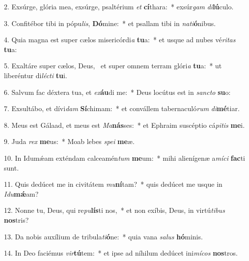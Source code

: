 2. Exsúrge, glória mea, exsúrge, psaltérium \textit{et} \textbf{cí}thara:~*  exsúr\textit{gam} \textit{di}\textbf{lú}culo.\

3. Confitébor tibi in pópu\textit{lis}, \textbf{Dó}mine:~*  et psallam tibi in \textit{na}\textit{ti}\textbf{ó}nibus.\

4. Quia magna est super cælos misericórdi\textit{a} \textbf{tu}a:~*  et usque ad nubes vé\textit{ri}\textit{tas} \textbf{tu}a:\

5. Exaltáre super cælos, Deus, \dag\  et super omnem terram glóri\textit{a} \textbf{tu}a:~*  ut liberéntur di\textit{léc}\textit{ti} \textbf{tu}i.\

6. Salvum fac déxtera tua, et \textit{ex}\textbf{áu}di me:~*  Deus locútus est in \textit{sanc}\textit{to} \textbf{su}o:\

7. Exsultábo, et dívi\textit{dam} \textbf{Sí}chimam:~*  et convállem tabernaculó\textit{rum} \textit{di}\textbf{mé}tiar.\

8. Meus est Gálaad, et meus est \textit{Ma}\textbf{nás}ses:~*  et Ephraim suscéptio cá\textit{pi}\textit{tis} \textbf{me}i.\

9. Juda \textit{rex} \textbf{me}us:~*  Moab lebes \textit{spe}\textit{i} \textbf{me}æ.\

10. In Idumǽam exténdam calceamén\textit{tum} \textbf{me}um:~*  mihi alienígenæ a\textit{mí}\textit{ci} \textbf{fac}ti sunt.\

11. Quis dedúcet me in civitátem \textit{mu}\textbf{ní}tam?~*  quis dedúcet me usque in \textit{I}\textit{du}\textbf{mǽ}am?\

12. Nonne tu, Deus, qui re\textit{pu}\textbf{lís}ti nos,~*  et non exíbis, Deus, in virtú\textit{ti}\textit{bus} \textbf{nos}tris?\

13. Da nobis auxílium de tribula\textit{ti}\textbf{ó}ne:~*  quia vana \textit{sa}\textit{lus} \textbf{hó}minis.\

14. In Deo faciémus \textit{vir}\textbf{tú}tem:~*  et ipse ad níhilum dedúcet ini\textit{mí}\textit{cos} \textbf{nos}tros.\

